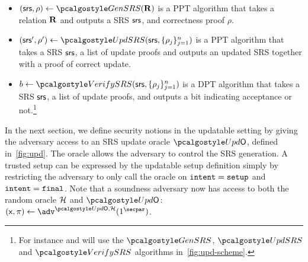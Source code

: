 \begin{itemize} 
	\item
	$(\srs,\rho) \gets \kgen(\REL)$ is a PPT algorithm that takes a relation $\mathbf{R}$ and outputs a SRS $\mathsf{srs}$, and correctness proof $\rho$.
	\item
	$ (\srs',\rho') \gets \upd(\srs, \{\rho_j \}_{j=1}^n)$ is a PPT algorithm that takes a SRS $\mathsf{srs}$, a list of update proofs and outputs an updated SRS together with a proof of correct update. 
	\item
	$b \gets \verifyCRS(\srs, \{\rho_j \}_{j=1}^n)$ is a DPT algorithm that takes a SRS $\mathsf{srs}$, a list of update proofs, and outputs a bit indicating acceptance or not.\footnote{For instance \plonk{} and \marlin{} will use the $\kgen$, $\upd$ and $\verifyCRS$ algorithms in~\cref{fig:upd-scheme}.}
\end{itemize}


In the next section, we define security notions in the updatable setting by giving the adversary access to an SRS update oracle $\initU$, defined in~\cref{fig:upd}. The oracle allows the adversary to control the SRS generation. A trusted setup can be expressed by the updatable setup definition simply by restricting the adversary to only call the oracle on $\mathtt{intent} = \mathtt{setup}$ and $\mathtt{intent} = \mathtt{final}$. Note that a soundness adversary now has access to both the random oracle $\mathcal{H}$ and $\initU$:  $(\inp, \zkproof) \gets \adv^{\initU,\ro}(1^\secpar)$. %

\newcommand*{\Scale}[2][4]{\scalebox{#1}{$#2$}}%


